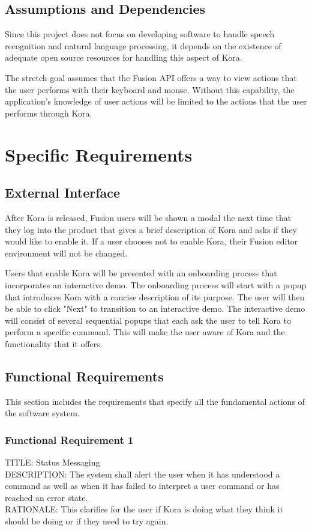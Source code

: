 \documentclass[onecolumn, draftclsnofoot,10pt, compsoc]{IEEEtran}
\def \botname{Kora\xspace}
\begin{document}
    \subsection{Assumptions and Dependencies}
        Since this project does not focus on developing software to handle speech recognition and natural language processing, it depends on the existence of adequate open source resources for handling this aspect of \botname. 

        The stretch goal assumes that the Fusion API offers a way to view actions that the user performs with their keyboard and mouse.
        Without this capability, the application's knowledge of user actions will be limited to the actions that the user performs through \botname.

\section{Specific Requirements}
    \subsection{External Interface}
       After \botname is released, Fusion users will be shown a modal the next time that they log into the product that gives a brief description of \botname and asks if they would like to enable it.
       If a user chooses not to enable \botname, their Fusion editor environment will not be changed. 

       Users that enable \botname will be presented with an onboarding process that incorporates an interactive demo.
       The onboarding process will start with a popup that introduces \botname with a concise description of its purpose.
       The user will then be able to click "Next" to transition to an interactive demo.
       The interactive demo will consist of several sequential popups that each ask the user to tell \botname to perform a specific command.
       This will make the user aware of \botname and the functionality that it offers.

    \subsection{Functional Requirements}
    This section includes the requirements that specify all the fundamental actions of the software system.
        \subsubsection{Functional Requirement 1}
        TITLE: Status Messaging \\
        DESCRIPTION: The system shall alert the user when it has understood a command as well as when it has failed to interpret a user command or has reached an error state. \\
        RATIONALE: This clarifies for the user if \botname is doing what they think it should be doing or if they need to try again. 
        
\end{document}
